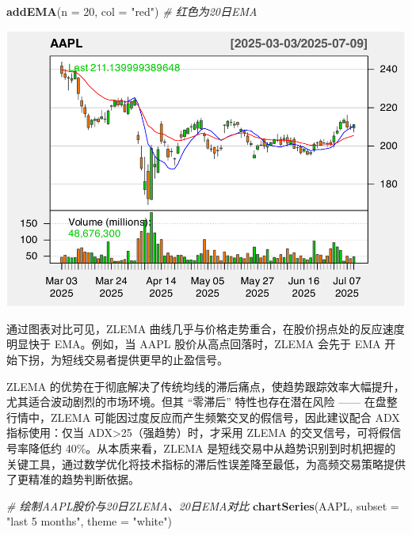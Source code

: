 \documentclass[]{ctexbook}
\newenvironment{Shaded}{\begin{snugshade}}{\end{snugshade}}
\newcommand{\AttributeTok}[1]{\textcolor[rgb]{0.13,0.29,0.53}{#1}}
\newcommand{\CommentTok}[1]{\textcolor[rgb]{0.56,0.35,0.01}{\textit{#1}}}
\newcommand{\DecValTok}[1]{\textcolor[rgb]{0.00,0.00,0.81}{#1}}
\newcommand{\FunctionTok}[1]{\textcolor[rgb]{0.13,0.29,0.53}{\textbf{#1}}}
\newcommand{\NormalTok}[1]{#1}
\newcommand{\StringTok}[1]{\textcolor[rgb]{0.31,0.60,0.02}{#1}}
\begin{document}
\begin{Shaded}
\begin{Highlighting}[]
\FunctionTok{addEMA}\NormalTok{(}\AttributeTok{n =} \DecValTok{20}\NormalTok{, }\AttributeTok{col =} \StringTok{"red"}\NormalTok{)      }\CommentTok{\# 红色为20日EMA}
\end{Highlighting}
\end{Shaded}

\includegraphics[width=0.9\linewidth]{quantmod_files/figure-latex/zlema-3}

通过图表对比可见，ZLEMA 曲线几乎与价格走势重合，在股价拐点处的反应速度明显快于 EMA。例如，当 AAPL 股价从高点回落时，ZLEMA 会先于 EMA 开始下拐，为短线交易者提供更早的止盈信号。

ZLEMA 的优势在于彻底解决了传统均线的滞后痛点，使趋势跟踪效率大幅提升，尤其适合波动剧烈的市场环境。但其 ``零滞后'' 特性也存在潜在风险 ------ 在盘整行情中，ZLEMA 可能因过度反应而产生频繁交叉的假信号，因此建议配合 ADX 指标使用：仅当 ADX\textgreater25（强趋势）时，才采用 ZLEMA 的交叉信号，可将假信号率降低约 40\%。从本质来看，ZLEMA 是短线交易中从趋势识别到时机把握的关键工具，通过数学优化将技术指标的滞后性误差降至最低，为高频交易策略提供了更精准的趋势判断依据。

\begin{Shaded}
\begin{Highlighting}[]
\CommentTok{\# 绘制AAPL股价与20日ZLEMA、20日EMA对比}
\FunctionTok{chartSeries}\NormalTok{(AAPL, }\AttributeTok{subset =} \StringTok{"last 5 months"}\NormalTok{, }\AttributeTok{theme =} \StringTok{"white"}\NormalTok{)}
\end{Highlighting}
\end{Shaded}
\end{document}

